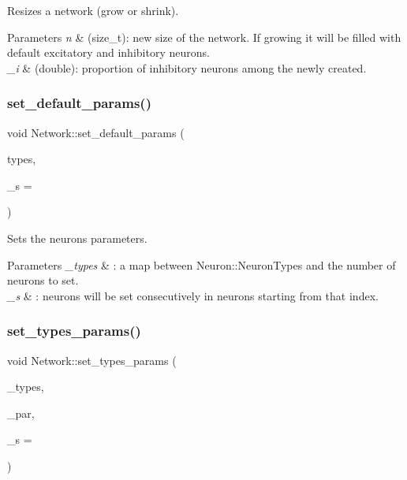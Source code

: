 Resizes a network (grow or shrink). 
\begin{DoxyParams}{Parameters}
{\em n} & (size\+\_\+t)\+: new size of the network. If growing it will be filled with default excitatory and inhibitory neurons. \\
\hline
{\em \+\_\+i} & (double)\+: proportion of inhibitory neurons among the newly created. \\
\hline
\end{DoxyParams}
\mbox{\label{classNetwork_ad1d20020028425cfab199da1942172c9}} 
\subsubsection{\texorpdfstring{set\+\_\+default\+\_\+params()}{set\_default\_params()}}
{\footnotesize\ttfamily void Network\+::set\+\_\+default\+\_\+params (\begin{DoxyParamCaption}\item[{const std\+::map$<$ std\+::string, size\+\_\+t $>$ \&}]{types,  }\item[{const size\+\_\+t}]{\+\_\+s = {} }\end{DoxyParamCaption})}

Sets the neurons parameters. 
\begin{DoxyParams}{Parameters}
{\em \+\_\+types} & \+: a map between Neuron\+::\+Neuron\+Types and the number of neurons to set. \\
\hline
{\em \+\_\+s} & \+: neurons will be set consecutively in neurons starting from that index. \\
\hline
\end{DoxyParams}
\mbox{\label{classNetwork_a40daf6578a6146f4c339f0efffd5070d}} 
\subsubsection{\texorpdfstring{set\+\_\+types\+\_\+params()}{set\_types\_params()}}
{\footnotesize\ttfamily void Network\+::set\+\_\+types\+\_\+params (\begin{DoxyParamCaption}\item[{const std\+::vector$<$ std\+::string $>$ \&}]{\+\_\+types,  }\item[{const std\+::vector$<$ \hyperlink{structNeuronParams}{Neuron\+Params} $>$ \&}]{\+\_\+par,  }\item[{const size\+\_\+t}]{\+\_\+s = {} }\end{DoxyParamCaption})}

